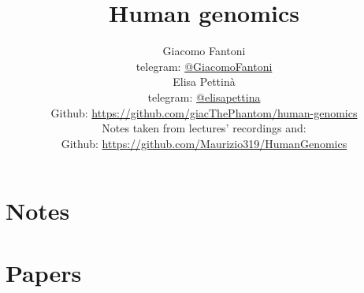 

\title{\Huge\textbf{{Human genomics}}}

\author{
  Giacomo Fantoni \\
  \small telegram: \href{https://t.me/GiacomoFantoni}{@GiacomoFantoni} \\[3pt]
  Elisa Pettin\`a \\
  \small telegram: \href{https://t.me/elisapettina}{@elisapettina} \\[3pt]
  \small Github: \href{https://github.com/giacThePhantom/human-genomics}{https://github.com/giacThePhantom/human-genomics}\\
  Notes taken from lectures' recordings and:\\
  \small Github: \href{https://github.com/Maurizio319/HumanGenomics}{https://github.com/Maurizio319/HumanGenomics}
}



\maketitle
\tableofcontents

  \part{Notes}
    
   
    
    
    
    
    
    
   
    



  \part{Papers}
    
    
   
    
   
    
   


